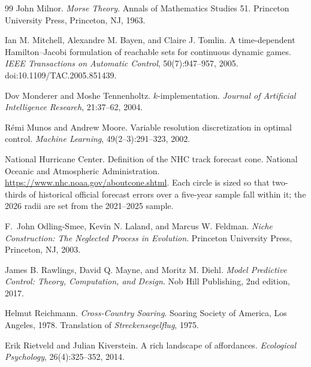 \documentclass[11pt,a4paper]{article}
\theoremstyle{remark}
\begin{document}
\begin{thebibliography}{99}
John Milnor.
\newblock \emph{Morse Theory}.
\newblock Annals of Mathematics Studies 51. Princeton University Press, Princeton, NJ, 1963.

Ian M. Mitchell, Alexandre M. Bayen, and Claire J. Tomlin.
\newblock A time-dependent Hamilton--Jacobi formulation of reachable sets for continuous dynamic games.
\newblock \emph{IEEE Transactions on Automatic Control}, 50(7):947--957, 2005.
\newblock doi:10.1109/TAC.2005.851439.

Dov Monderer and Moshe Tennenholtz.
\newblock $k$-implementation.
\newblock \emph{Journal of Artificial Intelligence Research}, 21:37--62, 2004.

R\'emi Munos and Andrew Moore.
\newblock Variable resolution discretization in optimal control.
\newblock \emph{Machine Learning}, 49(2--3):291--323, 2002.

National Hurricane Center.
\newblock Definition of the NHC track forecast cone.
\newblock National Oceanic and Atmospheric Administration.
\newblock \url{https://www.nhc.noaa.gov/aboutcone.shtml}.
\newblock Each circle is sized so that two-thirds of historical official forecast errors over a
five-year sample fall within it; the 2026 radii are set from the 2021--2025 sample.

F.~John Odling-Smee, Kevin N. Laland, and Marcus W. Feldman.
\newblock \emph{Niche Construction: The Neglected Process in Evolution}.
\newblock Princeton University Press, Princeton, NJ, 2003.

James B. Rawlings, David Q. Mayne, and Moritz M. Diehl.
\newblock \emph{Model Predictive Control: Theory, Computation, and Design}.
\newblock Nob Hill Publishing, 2nd edition, 2017.

Helmut Reichmann.
\newblock \emph{Cross-Country Soaring}.
\newblock Soaring Society of America, Los Angeles, 1978.
\newblock Translation of \emph{Streckensegelflug}, 1975.

Erik Rietveld and Julian Kiverstein.
\newblock A rich landscape of affordances.
\newblock \emph{Ecological Psychology}, 26(4):325--352, 2014.


\end{thebibliography}
\end{document}
